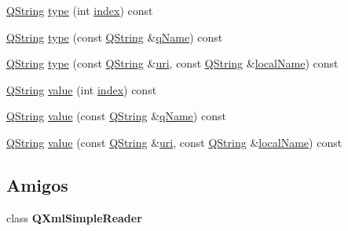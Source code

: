 \begin{DoxyCompactItemize}
\item 
\hyperlink{class_q_string}{Q\-String} \hyperlink{class_q_xml_attributes_a013193990259b68de6a2faccc4508d89}{type} (int \hyperlink{class_q_xml_attributes_a864bb4a85182ffbf8d15ce9353b6942b}{index}) const 
\item 
\hyperlink{class_q_string}{Q\-String} \hyperlink{class_q_xml_attributes_a5c14f34d7244a0d2d96ec649a86612d7}{type} (const \hyperlink{class_q_string}{Q\-String} \&\hyperlink{class_q_xml_attributes_ab93893ae887eb8ba2513fe3bb35af05b}{q\-Name}) const 
\item 
\hyperlink{class_q_string}{Q\-String} \hyperlink{class_q_xml_attributes_a22382f9c90cce97d131ac12571063d90}{type} (const \hyperlink{class_q_string}{Q\-String} \&\hyperlink{class_q_xml_attributes_aaa089f3b1e328f9122b7ffc7ab8788d8}{uri}, const \hyperlink{class_q_string}{Q\-String} \&\hyperlink{class_q_xml_attributes_a59acfa0ed737903c134e1bbb57e3c756}{local\-Name}) const 
\item 
\hyperlink{class_q_string}{Q\-String} \hyperlink{class_q_xml_attributes_a92989fe29a732d26d5fb56783d45c7d4}{value} (int \hyperlink{class_q_xml_attributes_a864bb4a85182ffbf8d15ce9353b6942b}{index}) const 
\item 
\hyperlink{class_q_string}{Q\-String} \hyperlink{class_q_xml_attributes_a3e185a6aaa9d4be452e91144ef8abdb4}{value} (const \hyperlink{class_q_string}{Q\-String} \&\hyperlink{class_q_xml_attributes_ab93893ae887eb8ba2513fe3bb35af05b}{q\-Name}) const 
\item 
\hyperlink{class_q_string}{Q\-String} \hyperlink{class_q_xml_attributes_a0fa4b73ad5244f69e476bd57522d60d9}{value} (const \hyperlink{class_q_string}{Q\-String} \&\hyperlink{class_q_xml_attributes_aaa089f3b1e328f9122b7ffc7ab8788d8}{uri}, const \hyperlink{class_q_string}{Q\-String} \&\hyperlink{class_q_xml_attributes_a59acfa0ed737903c134e1bbb57e3c756}{local\-Name}) const 
\end{DoxyCompactItemize}
\subsection*{Amigos}
\begin{DoxyCompactItemize}
\item 
\hypertarget{class_q_xml_attributes_aba6d8e1fe7917a5056b07bf8d4b4e53c}{class {\bfseries Q\-Xml\-Simple\-Reader}}\label{class_q_xml_attributes_aba6d8e1fe7917a5056b07bf8d4b4e53c}

\end{DoxyCompactItemize}


